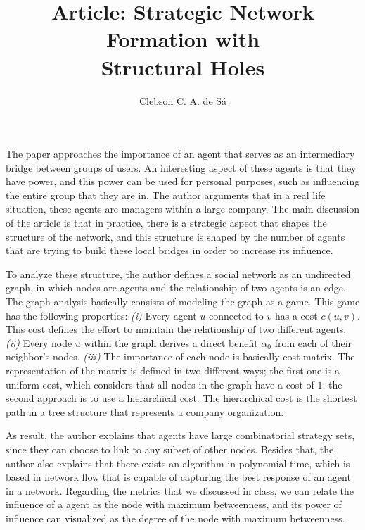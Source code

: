\documentclass[12pt, letterpaper]{article}
\title{Article: Strategic Network Formation with \\ Structural Holes}
\author{Clebson C. A. de Sá}
\begin{document}
\maketitle


The paper approaches the importance of an agent that serves as an intermediary bridge between groups of users.
An interesting aspect of these agents is that they have power, and this power can be used for personal purposes, such as influencing the entire group that they are in. 
The author arguments that in a real life situation, these agents are managers within a large company.
The main discussion of the article is that in practice, there is a strategic aspect that shapes the structure of the network, and this structure is shaped by the number of agents that are trying to build these local bridges in order to increase its influence.

To analyze these structure, the author defines a social network as an undirected graph, in which nodes are agents and the relationship of two agents is an edge.
The graph analysis basically consists of modeling the graph as a game. This game has the following properties: 
\textit{(i)} Every agent $u$ connected to $v$ has a cost $c(u, v)$. This cost defines the effort to maintain the relationship of two different agents.
\textit{(ii)} Every node $u$ within the graph derives a direct benefit $\alpha_0$ from each of their neighbor's nodes.
\textit{(iii)} The importance of each node is basically cost matrix. The representation of the matrix is defined in two different ways; the first one is a uniform cost, which considers that all nodes in the graph have a cost of $1$; the second approach is to use a hierarchical cost. The hierarchical cost is the shortest path in a tree structure that represents a company organization.

As result, the author explains that agents have large combinatorial strategy sets, since they can choose to link to any subset of other nodes. Besides that, the author also explains that there exists an algorithm in polynomial time, which is based in network flow that is capable of capturing the best response of an agent in a network.
Regarding the metrics that we discussed in class, we can relate the influence of a agent as the node with maximum betweenness, and its power of influence can visualized as the degree of the node with maximum betweenness.
\end{document}
